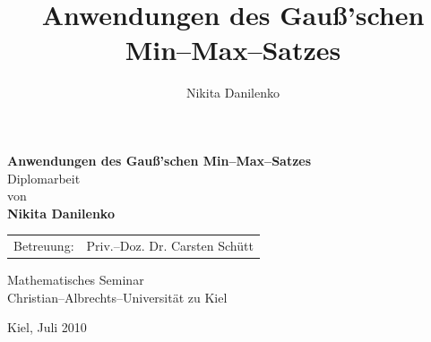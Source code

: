 \documentclass[a4paper]{thesis}
\author{Nikita Danilenko}
\title{Anwendungen des Gauß'schen Min--Max--Satzes}
\begin{document}
\begin{titlepage}


\begin{center}
{ \huge \bf Anwendungen des Gauß'schen Min--Max--Satzes}\\[3cm]
\vspace*{3cm}
{\large
Diplomarbeit\\
von\\
{\bf Nikita Danilenko} \\
}

\vspace*{\fill}

\begin{tabular}{rl}
Betreuung:& Priv.--Doz. Dr. Carsten Schütt\\
\end{tabular}
\end{center}
\vspace*{3cm}
\begin{center}
Mathematisches Seminar\\
Christian--Albrechts--Universität zu Kiel
\end{center}
\vspace*{3cm}
\begin{center}
Kiel, Juli 2010
\end{center}
\end{titlepage}
\end{document}
